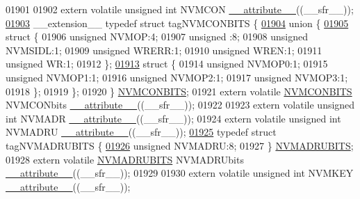 \begin{DoxyCode}
01901 
01902 \textcolor{keyword}{extern} \textcolor{keyword}{volatile} \textcolor{keywordtype}{unsigned} \textcolor{keywordtype}{int}  NVMCON \hyperlink{a00015_a493c46f03454991ccc5aa7a6e1dfb2a7}{\_\_attribute\_\_}((\_\_sfr\_\_));
\hypertarget{a00015_source_l01903}{}\hyperlink{a00014}{01903} \_\_extension\_\_ \textcolor{keyword}{typedef} \textcolor{keyword}{struct }tagNVMCONBITS \{
\hypertarget{a00015_source_l01904}{}\hyperlink{a00015}{01904}   \textcolor{keyword}{union }\{
\hypertarget{a00015_source_l01905}{}\hyperlink{a00015}{01905}     \textcolor{keyword}{struct }\{
01906       \textcolor{keywordtype}{unsigned} NVMOP:4;
01907       \textcolor{keywordtype}{unsigned} :8;
01908       \textcolor{keywordtype}{unsigned} NVMSIDL:1;
01909       \textcolor{keywordtype}{unsigned} WRERR:1;
01910       \textcolor{keywordtype}{unsigned} WREN:1;
01911       \textcolor{keywordtype}{unsigned} WR:1;
01912     \};
\hypertarget{a00015_source_l01913}{}\hyperlink{a00015}{01913}     \textcolor{keyword}{struct }\{
01914       \textcolor{keywordtype}{unsigned} NVMOP0:1;
01915       \textcolor{keywordtype}{unsigned} NVMOP1:1;
01916       \textcolor{keywordtype}{unsigned} NVMOP2:1;
01917       \textcolor{keywordtype}{unsigned} NVMOP3:1;
01918     \};
01919   \};
01920 \} \hyperlink{a00014_d4/d14/a00608}{NVMCONBITS};
01921 \textcolor{keyword}{extern} \textcolor{keyword}{volatile} \hyperlink{a00014_d4/d14/a00608}{NVMCONBITS} NVMCONbits \hyperlink{a00015_a493c46f03454991ccc5aa7a6e1dfb2a7}{\_\_attribute\_\_}((\_\_sfr\_\_));
01922 
01923 \textcolor{keyword}{extern} \textcolor{keyword}{volatile} \textcolor{keywordtype}{unsigned} \textcolor{keywordtype}{int}  NVMADR \hyperlink{a00015_a493c46f03454991ccc5aa7a6e1dfb2a7}{\_\_attribute\_\_}((\_\_sfr\_\_));
01924 \textcolor{keyword}{extern} \textcolor{keyword}{volatile} \textcolor{keywordtype}{unsigned} \textcolor{keywordtype}{int}  NVMADRU \hyperlink{a00015_a493c46f03454991ccc5aa7a6e1dfb2a7}{\_\_attribute\_\_}((\_\_sfr\_\_));
\hypertarget{a00015_source_l01925}{}\hyperlink{a00014}{01925} \textcolor{keyword}{typedef} \textcolor{keyword}{struct }tagNVMADRUBITS \{
\hypertarget{a00015_source_l01926}{}\hyperlink{a00014_a4d837a6bcd628797de13fba4b2afbe77}{01926}   \textcolor{keywordtype}{unsigned} NVMADRU:8;
01927 \} \hyperlink{a00014_d9/d07/a00607}{NVMADRUBITS};
01928 \textcolor{keyword}{extern} \textcolor{keyword}{volatile} \hyperlink{a00014_d9/d07/a00607}{NVMADRUBITS} NVMADRUbits \hyperlink{a00015_a493c46f03454991ccc5aa7a6e1dfb2a7}{\_\_attribute\_\_}((\_\_sfr\_\_));
01929 
01930 \textcolor{keyword}{extern} \textcolor{keyword}{volatile} \textcolor{keywordtype}{unsigned} \textcolor{keywordtype}{int}  NVMKEY \hyperlink{a00015_a493c46f03454991ccc5aa7a6e1dfb2a7}{\_\_attribute\_\_}((\_\_sfr\_\_));

\end{DoxyCode}
